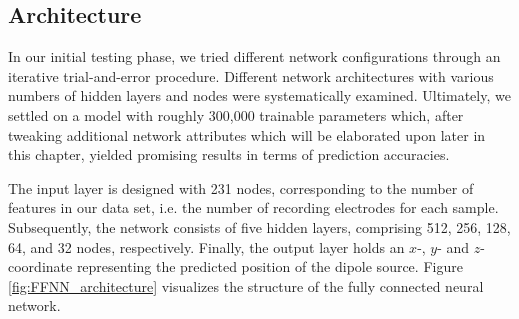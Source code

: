 \documentclass[a4paper, UKenglish, 11pt]{uiomaster}
\begin{document}
\subsection{Architecture}


In our initial testing phase, we tried different network configurations through an
iterative trial-and-error procedure. Different network architectures with various numbers of hidden layers and nodes were systematically examined. Ultimately, we settled on a model with roughly 300,000 trainable parameters which, after tweaking additional network attributes which will be elaborated upon later in this chapter, yielded promising results in terms of prediction accuracies.

The input layer is designed with 231 nodes, corresponding to the number of features in our data set, i.e. the number of recording electrodes for each sample. Subsequently, the network consists of five hidden layers, comprising 512, 256, 128, 64, and 32 nodes, respectively. Finally, the output layer holds an $x$-, $y$- and $z$-coordinate representing the predicted position of the dipole source. Figure \ref{fig:FFNN_architecture} visualizes the structure of the fully connected neural network.
\end{document}
